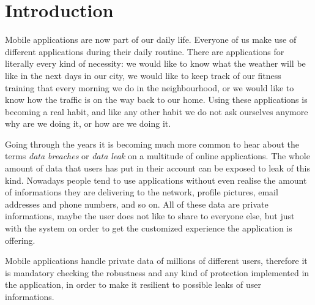 \chapter{Introduction}
	
	\par Mobile applications are now part of our daily life. Everyone of us make use of different applications during their daily routine. There are applications for literally every kind of necessity: we would like to know what the weather will be like in the next days in our city, we would like to keep track of our fitness training that every morning we do in the neighbourhood, or we would like to know how the traffic is on the way back to our home. Using these applications is becoming a real habit, and like any other habit we do not ask ourselves anymore why are we doing it, or how are we doing it.
	\par Going through the years it is becoming much more common to hear about the terms \textit{data breaches} or \textit{data leak} on a multitude of online applications. The whole amount of data that users has put in their account can be exposed to leak of this kind. \newline
	Nowadays people tend to use applications without even realise the amount of informations they are delivering to the network, profile pictures, email addresses and phone numbers, and so on. All of these data are private informations, maybe the user does not like to share to everyone else, but just with the system on order to get the customized experience the application is offering. \newline 
	\par Mobile applications handle private data of millions of different users, therefore it is mandatory checking the robustness and any kind of protection implemented in the application, in order to make it resilient to possible leaks of user informations.
	
